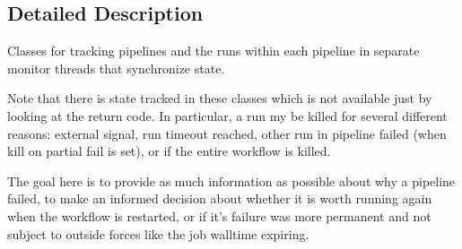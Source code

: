 \subsection{Detailed Description}
\begin{DoxyVerb}Classes for tracking pipelines and the runs within each pipeline in separate
monitor threads that synchronize state.

Note that there is state tracked in these classes which is not available just
by looking at the return code. In particular, a run my be killed for several
different reasons: external signal, run timeout reached, other run in pipeline
failed (when kill on partial fail is set), or if the entire workflow is killed.

The goal here is to provide as much information as possible about why a
pipeline failed, to make an informed decision about whether it is worth
running again when the workflow is restarted, or if it's failure was more
permanent and not subject to outside forces like the job walltime expiring.
\end{DoxyVerb}
 